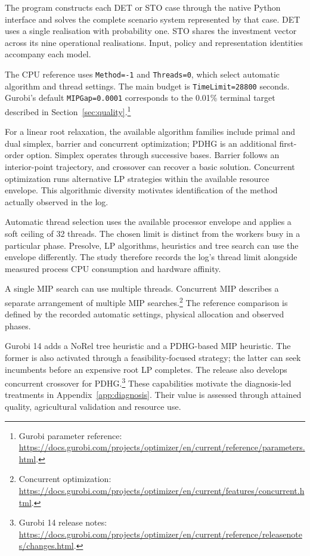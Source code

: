 \documentclass[11pt,a4paper]{article}
\newcommand{\code}[1]{{\small\texttt{#1}}}
\newcommand{\technical}[2]{\footnote{#1: \url{#2}.}}
\begin{document}
The program constructs each DET or STO case through the native Python interface and solves the complete scenario system represented by that case. DET uses a single realisation with probability one. STO shares the investment vector across its nine operational realisations. Input, policy and representation identities accompany each model.

The CPU reference uses \code{Method=-1} and \code{Threads=0}, which select automatic algorithm and thread settings. The main budget is \code{TimeLimit=28800} seconds. Gurobi's default \code{MIPGap=0.0001} corresponds to the 0.01\% terminal target described in Section~\ref{sec:quality}.\technical{Gurobi parameter reference}{https://docs.gurobi.com/projects/optimizer/en/current/reference/parameters.html}

For a linear root relaxation, the available algorithm families include primal and dual simplex, barrier and concurrent optimization; PDHG is an additional first-order option. Simplex operates through successive bases. Barrier follows an interior-point trajectory, and crossover can recover a basic solution. Concurrent optimization runs alternative LP strategies within the available resource envelope. This algorithmic diversity motivates identification of the method actually observed in the log.

Automatic thread selection uses the available processor envelope and applies a soft ceiling of 32 threads. The chosen limit is distinct from the workers busy in a particular phase. Presolve, LP algorithms, heuristics and tree search can use the envelope differently. The study therefore records the log's thread limit alongside measured process CPU consumption and hardware affinity.

A single MIP search can use multiple threads. Concurrent MIP describes a separate arrangement of multiple MIP searches.\technical{Concurrent optimization}{https://docs.gurobi.com/projects/optimizer/en/current/features/concurrent.html} The reference comparison is defined by the recorded automatic settings, physical allocation and observed phases.

Gurobi 14 adds a NoRel tree heuristic and a PDHG-based MIP heuristic. The former is also activated through a feasibility-focused strategy; the latter can seek incumbents before an expensive root LP completes. The release also develops concurrent crossover for PDHG.\technical{Gurobi 14 release notes}{https://docs.gurobi.com/projects/optimizer/en/current/reference/releasenotes/changes.html} These capabilities motivate the diagnosis-led treatments in Appendix~\ref{app:diagnosis}. Their value is assessed through attained quality, agricultural validation and resource use.
\end{document}
